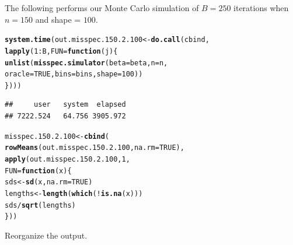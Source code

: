 \documentclass[11pt]{article}\usepackage[]{graphicx}\usepackage[]{color}
\makeatletter
\newcommand{\hlnum}[1]{\textcolor[rgb]{0.686,0.059,0.569}{#1}}%
\newcommand{\hlopt}[1]{\textcolor[rgb]{0,0,0}{#1}}%
\newcommand{\hlstd}[1]{\textcolor[rgb]{0.345,0.345,0.345}{#1}}%
\newcommand{\hlkwa}[1]{\textcolor[rgb]{0.161,0.373,0.58}{\textbf{#1}}}%
\newcommand{\hlkwb}[1]{\textcolor[rgb]{0.69,0.353,0.396}{#1}}%
\newcommand{\hlkwc}[1]{\textcolor[rgb]{0.333,0.667,0.333}{#1}}%
\newcommand{\hlkwd}[1]{\textcolor[rgb]{0.737,0.353,0.396}{\textbf{#1}}}%
\newenvironment{kframe}{%
 \def\at@end@of@kframe{}%
 \ifinner\ifhmode%
  \def\at@end@of@kframe{\end{minipage}}%
  \begin{minipage}{\columnwidth}%
 \fi\fi%
 \def\FrameCommand##1{\hskip\@totalleftmargin \hskip-\fboxsep
 \colorbox{shadecolor}{##1}\hskip-\fboxsep
     \hskip-\linewidth \hskip-\@totalleftmargin \hskip\columnwidth}%
 \MakeFramed {\advance\hsize-\width
   \@totalleftmargin\z@ \linewidth\hsize
   \@setminipage}}%
 {\par\unskip\endMakeFramed%
 \at@end@of@kframe}
\newenvironment{knitrout}{}{} %
\makeatother
\begin{document}
The following performs our Monte Carlo simulation of $B = 250$ iterations 
when $n = 150$ and shape = $100$.

\begin{knitrout}
\color{fgcolor}\begin{kframe}
\begin{alltt}
\hlkwd{system.time}\hlstd{(out.misspec.150.2.100} \hlkwb{<-} \hlkwd{do.call}\hlstd{(cbind,}
  \hlkwd{lapply}\hlstd{(}\hlnum{1}\hlopt{:}\hlstd{B,} \hlkwc{FUN} \hlstd{=} \hlkwa{function}\hlstd{(}\hlkwc{j}\hlstd{)\{}
    \hlkwd{unlist}\hlstd{(}\hlkwd{misspec.simulator}\hlstd{(}\hlkwc{beta} \hlstd{= beta,} \hlkwc{n} \hlstd{= n,}
      \hlkwc{oracle} \hlstd{=} \hlnum{TRUE}\hlstd{,} \hlkwc{bins} \hlstd{= bins,} \hlkwc{shape} \hlstd{=} \hlnum{100}\hlstd{))}
\hlstd{\})))}
\end{alltt}
\begin{verbatim}
##     user   system  elapsed 
## 7222.524   64.756 3905.972
\end{verbatim}
\end{kframe}
\end{knitrout}

\begin{knitrout}
\color{fgcolor}\begin{kframe}
\begin{alltt}
\hlstd{misspec.150.2.100} \hlkwb{<-} \hlkwd{cbind}\hlstd{(}
  \hlkwd{rowMeans}\hlstd{(out.misspec.150.2.100,} \hlkwc{na.rm} \hlstd{=} \hlnum{TRUE}\hlstd{),}
  \hlkwd{apply}\hlstd{(out.misspec.150.2.100,} \hlnum{1}\hlstd{,}
  \hlkwc{FUN} \hlstd{=} \hlkwa{function}\hlstd{(}\hlkwc{x}\hlstd{)\{}
    \hlstd{sds} \hlkwb{<-} \hlkwd{sd}\hlstd{(x,} \hlkwc{na.rm} \hlstd{=} \hlnum{TRUE}\hlstd{)}
    \hlstd{lengths} \hlkwb{<-} \hlkwd{length}\hlstd{(}\hlkwd{which}\hlstd{(}\hlopt{!}\hlkwd{is.na}\hlstd{(x)))}
    \hlstd{sds} \hlopt{/} \hlkwd{sqrt}\hlstd{(lengths)}
  \hlstd{\}))}
\end{alltt}
\end{kframe}
\end{knitrout}


Reorganize the output.
\end{document}
